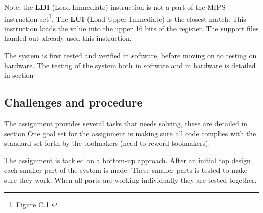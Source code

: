 Note: the {\bf LDI} (Load Immediate) instruction is not a part of the MIPS instruction set\footnote{Figure C.1 \cite[p.66]{compendium}}.
The {\bf LUI} (Load Upper Immediate) is the closest match.
This instruction loads the value into the upper 16 bits of the register.
The support files handed out already used this instruction.

The system is first tested and verified in software, before moving on to testing on hardware.
The testing of the system both in software and in hardware is detailed in section%

\subsection{Challenges and procedure}

The assignment provides several tasks that needs solving, these are detailed in section%
One goal set for the assignment is making sure all code complies with the standard set forth by the toolmakers (need to reword toolmakers).

The assignment is tackled on a bottom-up approach.
After an initial top design each smaller part of the system is made.
These smaller parts is tested to make sure they work.
When all parts are working individually they are tested together.
